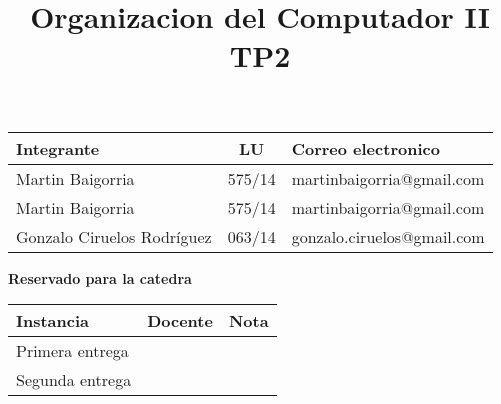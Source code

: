 \documentclass[10pt,a4paper]{article}
\title{Organizacion del Computador II \\ TP2}
\begin{document}

\maketitle

\bigskip

\begin{table}[h]
\centering
\begin{tabular}{|l l l|}
\hline
Integrante       & \multicolumn{1}{c}{LU}     & Correo electronico        \\ \hline
Martin Baigorria & \multicolumn{1}{c}{575/14} & martinbaigorria@gmail.com \\ 
Martin Baigorria & 575/14                      & martinbaigorria@gmail.com \\
Gonzalo Ciruelos Rodríguez & 063/14           & gonzalo.ciruelos@gmail.com \\ \hline
\end{tabular}
\end{table}

\vfill

\begin{center}
\textbf{Reservado para la catedra}
\end{center}
\begin{table}[h]
\centering
\begin{tabular}{|l|l|l|}
\hline
Instancia       & Docente & Nota \\ \hline
Primera entrega &         &      \\ \hline
Segunda entrega &         &      \\ \hline
\end{tabular}
\end{table}


\tableofcontents


\pagebreak


\newpage


\newpage


\newpage


\newpage


\newpage

\end{document}

